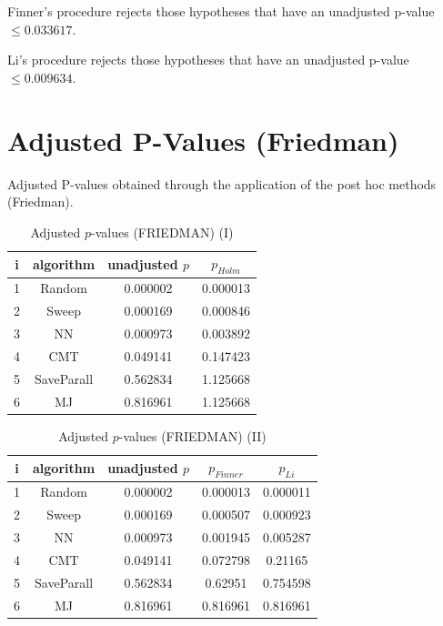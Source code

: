 \documentclass[a4paper,10pt]{article}
\begin{document}
\begin{landscape}
Finner's procedure rejects those hypotheses that have an unadjusted p-value $\le0.033617$.

Li's procedure rejects those hypotheses that have an unadjusted p-value $\le0.009634$.


\newpage

\section{Adjusted P-Values (Friedman)}


Adjusted P-values obtained through the application of the post hoc methods (Friedman).

\begin{table}[!htp]
\centering\small
\begin{tabular}{cccc}
i&algorithm&unadjusted $p$&$p_{Holm}$\\
\hline1&Random&0.000002&0.000013\\2&Sweep&0.000169&0.000846\\3&NN&0.000973&0.003892\\4&CMT&0.049141&0.147423\\5&SaveParall&0.562834&1.125668\\6&MJ&0.816961&1.125668\\\hline
\end{tabular}
\caption{Adjusted $p$-values (FRIEDMAN) (I)}
\end{table}
\begin{table}[!htp]
\centering\small
\begin{tabular}{ccccc}
i&algorithm&unadjusted $p$&$p_{Finner}$&$p_{Li}$\\
\hline1&Random&0.000002&0.000013&0.000011\\2&Sweep&0.000169&0.000507&0.000923\\3&NN&0.000973&0.001945&0.005287\\4&CMT&0.049141&0.072798&0.21165\\5&SaveParall&0.562834&0.62951&0.754598\\6&MJ&0.816961&0.816961&0.816961\\\hline
\end{tabular}
\caption{Adjusted $p$-values (FRIEDMAN) (II)}
\end{table}

\newpage
\end{landscape}
\end{document}
